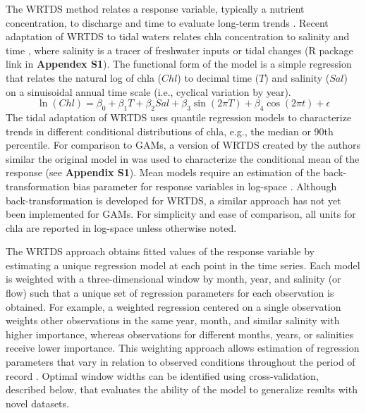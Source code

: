 \documentclass[letterpaper,12pt,oneside]{article}\usepackage[]{graphicx}\usepackage[]{color}
\begin{document}
The \ac{WRTDS} method relates a response variable, typically a nutrient concentration, to discharge and time to evaluate long-term trends \citep{Hirsch10,Hirsch14}. Recent adaptation of \ac{WRTDS} to tidal waters relates \ac{chla} concentration to salinity and time \citep{Beck15}, where salinity is a tracer of freshwater inputs or tidal changes (R package link in {\bf Appendex S1}).  The functional form of the model is a simple regression that relates the natural log of \ac{chla} ($Chl$) to decimal time ($T$) and salinity ($Sal$) on a sinuisoidal annual time scale (i.e., cyclical variation by year). 
\begin{equation} \label{eqn:funform}
\ln\left(Chl\right) = \beta_0 + \beta_1 T + \beta_2 Sal + \beta_3 \sin\left(2\pi T\right) + \beta_4 \cos\left(2\pi t\right) + \epsilon
\end{equation}
The tidal adaptation of \ac{WRTDS} uses quantile regression models \citep{Cade03} to characterize trends in different conditional distributions of \ac{chla}, e.g., the median or 90th percentile. For comparison to \acp{GAM}, a version of \ac{WRTDS} created by the authors similar the original model in \citet{Hirsch10} was used to characterize the conditional mean of the response (see {\bf Appendix S1}).  Mean models require an estimation of the back-transformation bias parameter for response variables in log-space \citep{Hirsch10}.  Although back-transformation is developed for \ac{WRTDS}, a similar approach has not yet been implemented for \acp{GAM}.  For simplicity and ease of comparison, all units for \ac{chla} are reported in log-space unless otherwise noted.

The \ac{WRTDS} approach obtains fitted values of the response variable by estimating a unique regression model at each point in the time series. Each model is weighted with a three-dimensional window by month, year, and salinity (or flow) such that a unique set of regression parameters for each observation is obtained. For example, a weighted regression centered on a single observation weights other observations in the same year, month, and similar salinity with higher importance, whereas observations for different months, years, or salinities receive lower importance. This weighting approach allows estimation of regression parameters that vary in relation to observed conditions throughout the period of record \citep{Hirsch10}. Optimal window widths can be identified using cross-validation, described below, that evaluates the ability of the model to generalize results with novel datasets.
\end{document}
